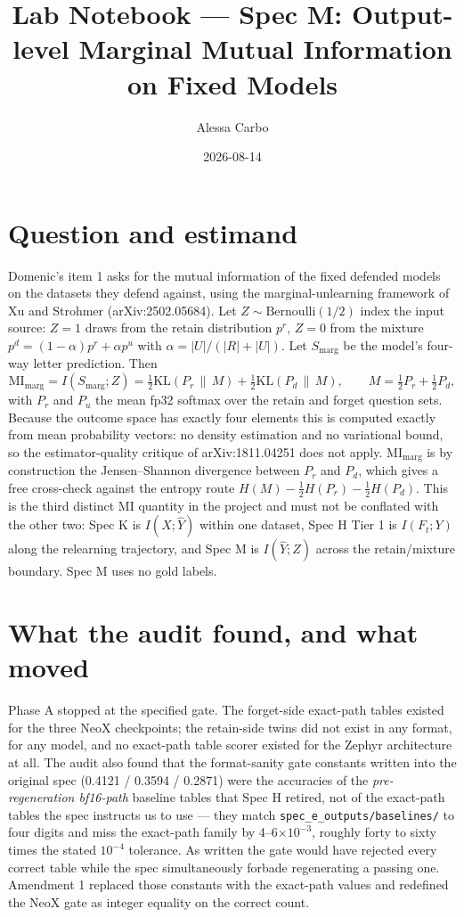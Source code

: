 \documentclass[11pt]{article}
\title{Lab Notebook --- Spec M: Output-level Marginal Mutual Information on Fixed Models}
\author{Alessa Carbo}
\date{2026-08-14}
\begin{document}
\maketitle
\section{Question and estimand}
Domenic's item 1 asks for the mutual information of the fixed defended models
on the datasets they defend against, using the marginal-unlearning framework of Xu and
Strohmer (arXiv:2502.05684). Let $Z\sim\mathrm{Bernoulli}(1/2)$ index the input source:
$Z=1$ draws from the retain distribution $p^r$, $Z=0$ from the mixture
$p^d=(1-\alpha)p^r+\alpha p^u$ with $\alpha=|U|/(|R|+|U|)$. Let $S_{\mathrm{marg}}$ be the
model's four-way letter prediction. Then
\[ \mathrm{MI}_{\mathrm{marg}}=I(S_{\mathrm{marg}};Z)
=\tfrac12\mathrm{KL}(P_r\,\|\,M)+\tfrac12\mathrm{KL}(P_d\,\|\,M),\qquad
M=\tfrac12 P_r+\tfrac12 P_d, \]
with $P_r$ and $P_u$ the mean fp32 softmax over the retain and forget question
sets. Because the outcome space has exactly four elements this is computed exactly from
mean probability vectors: no density estimation and no variational bound, so the
estimator-quality critique of arXiv:1811.04251 does not apply. $\mathrm{MI}_{\mathrm{marg}}$
is by construction the Jensen--Shannon divergence between $P_r$ and $P_d$, which gives a
free cross-check against the entropy route $H(M)-\tfrac12H(P_r)-\tfrac12H(P_d)$.
This is the third distinct MI quantity in the project and must not be conflated
with the other two: Spec K is $I(X;\widehat Y)$ within one dataset, Spec H Tier 1 is
$I(F_t;Y)$ along the relearning trajectory, and Spec M is $I(\widehat Y;Z)$ across the
retain/mixture boundary. Spec M uses no gold labels.
\section{What the audit found, and what moved}
Phase A stopped at the specified gate. The forget-side exact-path tables existed
for the three NeoX checkpoints; the retain-side twins did not exist in any format, for any
model, and no exact-path table scorer existed for the Zephyr architecture at all. The audit
also found that the format-sanity gate constants written into the original spec
(0.4121 / 0.3594 / 0.2871) were the accuracies of the \emph{pre-regeneration bf16-path}
baseline tables that Spec H retired, not of the exact-path tables the spec instructs us to
use --- they match \texttt{spec\_e\_outputs/baselines/} to four digits and miss the
exact-path family by 4--6$\times10^{-3}$, roughly forty to sixty times the stated $10^{-4}$
tolerance. As written the gate would have rejected every correct table while the spec
simultaneously forbade regenerating a passing one. Amendment 1 replaced those constants with
the exact-path values and redefined the NeoX gate as integer equality on the correct count.
\end{document}
